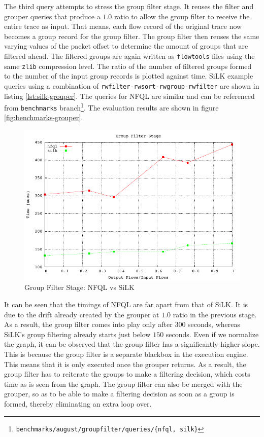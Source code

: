 The third query attempts to stress the group filter stage. It reuses the
filter and grouper queries that produce a $1.0$ ratio to allow the group
filter to receive the entire trace as input. That means, each flow record of
the original trace now becomes a group record for the group filter.  The group
filter then reuses the same varying values of the packet offset to determine
the amount of groups that are filtered ahead. The filtered groups
 are again written as \texttt{flowtools}
files using the same \texttt{zlib} compression level. The ratio of the number
of filtered groups formed to the number of the input group records is plotted
against time. SiLK example queries using a combination of
\texttt{rwfilter-rwsort-rwgroup-rwfilter} are shown in listing
\ref{lst:silk-grouper}.  The queries for \ac{NFQL} are similar and can be
referenced from \texttt{benchmarks}
branch\footnote{\texttt{benchmarks/august/groupfilter/queries/\{nfql,
silk\}}}.  The evaluation results are shown in figure
\ref{fig:benchmarks-grouper}.

\begin{figure}[h!]
  \begin{center}
    \includegraphics* [width=0.8\linewidth]{figures/benchmarks/groupfilter}
    \caption{Group Filter Stage: NFQL vs SiLK}
    \label{fig:fv1-fv2-filter}
  \end{center}
\end{figure}

It can be seen that the timings of \ac{NFQL} are far apart from that of SiLK.
It is due to the drift already created by the grouper at $1.0$ ratio in the
previous stage. As a result, the group filter comes into play only after $300$
seconds, whereas SiLK's group filtering already starts just below $150$
seconds. Even if  we
normalize the graph, it can be observed that the group filter has a
significantly higher slope. This is because the group filter is a separate
blackbox in the execution engine. This means that it is only executed once the
grouper returns. As a result, the group filter has to reiterate the groups to
make a filtering decision, which costs time as is seen from the graph. The
group filter can also be merged with the grouper, so as to be able to make a
filtering decision as soon as a group is formed, thereby eliminating an extra
loop over.

